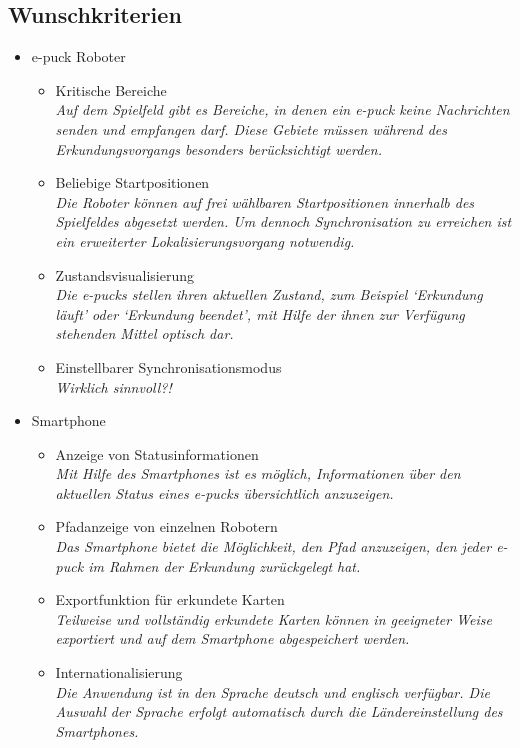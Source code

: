 \documentclass[10pt,a4paper]{article}
\begin{document}
		\subsection{Wunschkriterien}
			\begin{itemize}
				\item e-puck Roboter
				\begin{itemize}
					\item Kritische Bereiche
						\\ \textsl{Auf dem Spielfeld gibt es Bereiche, in denen ein e-puck keine Nachrichten senden
							und empfangen darf. Diese Gebiete müssen während des Erkundungsvorgangs besonders berücksichtigt
							werden.}											
					\item Beliebige Startpositionen
						\\ \textsl{Die Roboter können auf frei wählbaren Startpositionen innerhalb des Spielfeldes
							abgesetzt werden. Um dennoch Synchronisation zu erreichen ist ein erweiterter Lokalisierungsvorgang
							notwendig.}
					\item Zustandsvisualisierung
						\\ \textsl{Die e-pucks stellen ihren aktuellen Zustand, zum Beispiel `Erkundung läuft' oder `Erkundung
							beendet', mit Hilfe der ihnen zur Verfügung stehenden Mittel optisch dar.}												
					\item Einstellbarer Synchronisationsmodus
						\\ \textsl{Wirklich sinnvoll?!}		
				\end{itemize}
				\item Smartphone
				\begin{itemize}
					\item Anzeige von Statusinformationen
						\\ \textsl{Mit Hilfe des Smartphones ist es möglich, Informationen über den aktuellen Status eines e-pucks
							übersichtlich anzuzeigen.}		
					\item Pfadanzeige von einzelnen Robotern
						\\ \textsl{Das Smartphone bietet die Möglichkeit, den Pfad anzuzeigen, den jeder e-puck im Rahmen der
							Erkundung zurückgelegt hat.}							
					\item Exportfunktion für erkundete Karten
						\\ \textsl{Teilweise und vollständig erkundete Karten können in geeigneter Weise exportiert und auf dem
							Smartphone abgespeichert werden.}		
					\item Internationalisierung
						\\ \textsl{Die Anwendung ist in den Sprache deutsch und englisch verfügbar. Die Auswahl der Sprache
							erfolgt automatisch durch die Ländereinstellung des Smartphones.}									
				\end{itemize}
			\end{itemize}
\end{document}
